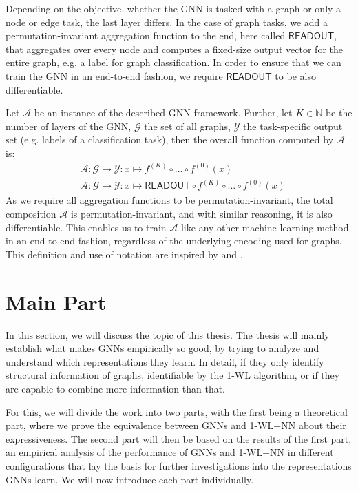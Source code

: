 \documentclass[11pt, dvipsnames, DIV=12]{scrreprt}
\theoremstyle{definition}
\begin{document}
Depending on the objective, whether the GNN is tasked with a graph or only a node or edge task, the last layer differs. In the case of graph tasks, we add a permutation-invariant aggregation function to the end, here called $\textsf{READOUT}$, that aggregates over every node and computes a fixed-size output vector for the entire graph, e.g. a label for graph classification. In order to ensure that we can train the GNN in an end-to-end fashion, we require $\textsf{READOUT}$ to be also differentiable.

Let $\mathcal{A}$ be an instance of the described GNN framework. Further, let $K \in \mathbb{N}$ be the number of layers of the GNN, $\mathcal{G}$ the set of all graphs, $\mathcal{Y}$ the task-specific output set (e.g. labels of a classification task), then the overall function computed by $\mathcal{A}$ is:
\begin{align}
    &\mathcal{A}: \mathcal{G} \rightarrow \mathcal{Y}: x \mapsto f^{(K)} \circ \ldots \circ f^{(0)}(x)\\
    &\mathcal{A}: \mathcal{G} \rightarrow \mathcal{Y}: x \mapsto \textsf{READOUT} \circ f^{(K)} \circ \ldots \circ f^{(0)}(x)
\end{align}
As we require all aggregation functions to be permutation-invariant, the total composition $\mathcal{A}$ is permutation-invariant, and with similar reasoning, it is also differentiable. This enables us to train $\mathcal{A}$ like any other machine learning method in an end-to-end fashion, regardless of the underlying encoding used for graphs. This definition and use of notation are inspired by \cite{Morris2018} and \cite{Xu2018}.


\section{Main Part}
In this section, we will discuss the topic of this thesis. The thesis will mainly establish what makes GNNs empirically so good, by trying to analyze and understand which representations they learn. In detail, if they only identify structural information of graphs, identifiable by the 1-WL algorithm, or if they are capable to combine more information than that.

For this, we will divide the work into two parts, with the first being a theoretical part, where we prove the equivalence between GNNs and 1-WL+NN about their expressiveness. The second part will then be based on the results of the first part, an empirical analysis of the performance of GNNs and 1-WL+NN in different configurations that lay the basis for further investigations into the representations GNNs learn. We will now introduce each part individually.
\end{document}
